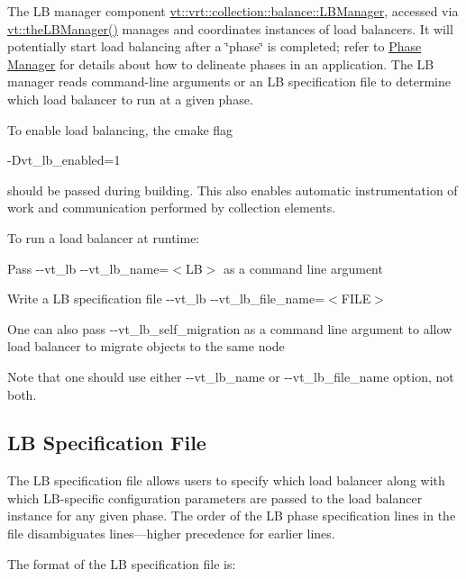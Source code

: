The LB manager component {\ttfamily \hyperlink{structvt_1_1vrt_1_1collection_1_1balance_1_1_l_b_manager}{vt\+::vrt\+::collection\+::balance\+::\+L\+B\+Manager}}, accessed via {\ttfamily \hyperlink{namespacevt_a05187076eac8c66c9951b062b0955520}{vt\+::the\+L\+B\+Manager()}} manages and coordinates instances of load balancers. It will potentially start load balancing after a \char`\"{}phase\char`\"{} is completed; refer to \hyperlink{phase}{Phase Manager} for details about how to delineate phases in an application. The LB manager reads command-\/line arguments or an LB specification file to determine which load balancer to run at a given phase.

To enable load balancing, the cmake flag
\begin{DoxyCode}
-Dvt\_lb\_enabled=1
\end{DoxyCode}
 should be passed during building. This also enables automatic instrumentation of work and communication performed by collection elements.

To run a load balancer at runtime\+:


\begin{DoxyItemize}
\item Pass {\ttfamily -\/-\/vt\+\_\+lb -\/-\/vt\+\_\+lb\+\_\+name=$<$LB$>$} as a command line argument
\item Write a LB specification file {\ttfamily -\/-\/vt\+\_\+lb -\/-\/vt\+\_\+lb\+\_\+file\+\_\+name=$<$F\+I\+LE$>$}
\item One can also pass {\ttfamily -\/-\/vt\+\_\+lb\+\_\+self\+\_\+migration} as a command line argument to allow load balancer to migrate objects to the same node
\end{DoxyItemize}

Note that one should use either {\ttfamily -\/-\/vt\+\_\+lb\+\_\+name} or {\ttfamily -\/-\/vt\+\_\+lb\+\_\+file\+\_\+name} option, not both.\hypertarget{lb-manager_lb-specification-file}{}\subsection{L\+B Specification File}\label{lb-manager_lb-specification-file}
The LB specification file allows users to specify which load balancer along with which L\+B-\/specific configuration parameters are passed to the load balancer instance for any given phase. The order of the LB phase specification lines in the file disambiguates lines---higher precedence for earlier lines.

The format of the LB specification file is\+:


